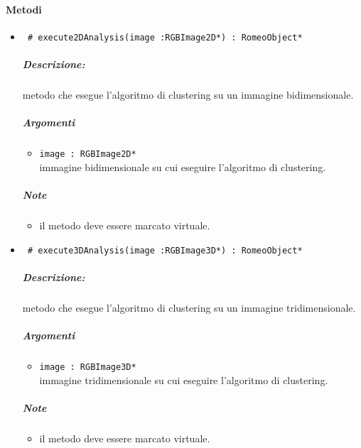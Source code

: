 \paragraph{Metodi\\}
	\begin{itemize}
		\item \color{blue}\verb! # execute2DAnalysis(image :RGBImage2D*) : RomeoObject* !\\
			\color{black}
			\subparagraph{Descrizione:} metodo che esegue l'algoritmo di clustering su un immagine bidimensionale.
			\subparagraph{Argomenti}
				\begin{itemize}
					\item \color{RoyalPurple}\verb!image : RGBImage2D*!\\
					\color{black} immagine bidimensionale su cui eseguire l'algoritmo di clustering.
				\end{itemize}
				\subparagraph{Note}
				\begin{itemize}
					\item il metodo deve essere marcato virtuale.
				\end{itemize}
				
		\item \color{blue}\verb! # execute3DAnalysis(image :RGBImage3D*) : RomeoObject* !\\
			\color{black}
			\subparagraph{Descrizione:} metodo che esegue l'algoritmo di clustering su un immagine tridimensionale.
			\subparagraph{Argomenti}
				\begin{itemize}
					\item \color{RoyalPurple}\verb!image : RGBImage3D*!\\
					\color{black} immagine tridimensionale su cui eseguire l'algoritmo di clustering.
				\end{itemize}
				\subparagraph{Note}
				\begin{itemize}
					\item il metodo deve essere marcato virtuale.
				\end{itemize}
				

\end{itemize}
